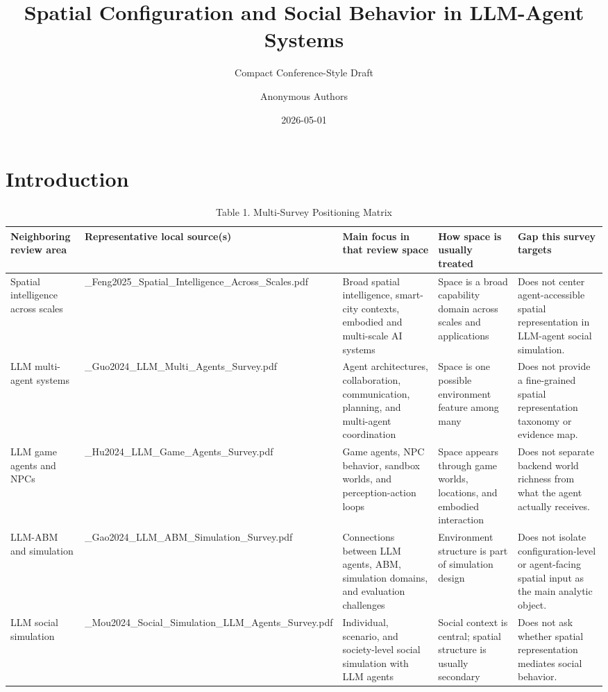 \documentclass[
  twocolumn]{article}
\title{Spatial Configuration and Social Behavior in LLM-Agent Systems}
\subtitle{Compact Conference-Style Draft}
\author{Anonymous Authors}
\date{2026-05-01}
\begin{document}
\maketitle

\section{Introduction}\label{introduction}

\begin{table}[t]
\centering
\caption{Table 1. Multi-Survey Positioning Matrix}
\scriptsize
\setlength{\tabcolsep}{3pt}
\renewcommand{\arraystretch}{1.12}
\begin{tabular}{@{}>{\raggedright\arraybackslash}p{}|>{\raggedright\arraybackslash}p{}|>{\raggedright\arraybackslash}p{}|>{\raggedright\arraybackslash}p{}|>{\raggedright\arraybackslash}p{}@{}}
\toprule
Neighboring review area & Representative local source(s) & Main focus in that review space & How space is usually treated & Gap this survey targets \\
\midrule
Spatial intelligence across scales & 01\_Feng2025\_Spatial\_Intelligence\_Across\_Scales.pdf & Broad spatial intelligence, smart-city contexts, embodied and multi-scale AI systems & Space is a broad capability domain across scales and applications & Does not center agent-accessible spatial representation in LLM-agent social simulation. \\
LLM multi-agent systems & 02\_Guo2024\_LLM\_Multi\_Agents\_Survey.pdf & Agent architectures, collaboration, communication, planning, and multi-agent coordination & Space is one possible environment feature among many & Does not provide a fine-grained spatial representation taxonomy or evidence map. \\
LLM game agents and NPCs & 03\_Hu2024\_LLM\_Game\_Agents\_Survey.pdf & Game agents, NPC behavior, sandbox worlds, and perception-action loops & Space appears through game worlds, locations, and embodied interaction & Does not separate backend world richness from what the agent actually receives. \\
LLM-ABM and simulation & 04\_Gao2024\_LLM\_ABM\_Simulation\_Survey.pdf & Connections between LLM agents, ABM, simulation domains, and evaluation challenges & Environment structure is part of simulation design & Does not isolate configuration-level or agent-facing spatial input as the main analytic object. \\
LLM social simulation & 05\_Mou2024\_Social\_Simulation\_LLM\_Agents\_Survey.pdf & Individual, scenario, and society-level social simulation with LLM agents & Social context is central; spatial structure is usually secondary & Does not ask whether spatial representation mediates social behavior. \\

\end{tabular}
\end{table}
\end{document}

